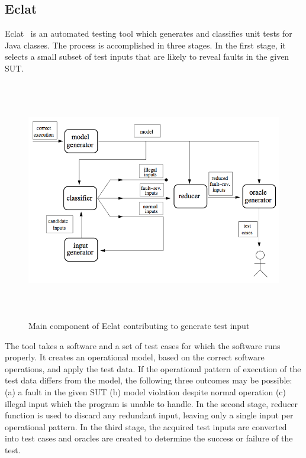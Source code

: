 \subsection{Eclat}
Eclat~\cite{Pacheco2005} is an automated testing tool which generates and classifies unit tests for Java classes. The process is accomplished in three stages. In the first stage, it selects a small subset of test inputs that are likely to reveal faults in the given SUT.

\begin{figure}[h]
	\centering
	\includegraphics[width=15cm, height=10.5cm]{chapter3/eclat_working.png}
	\caption{Main component of Eclat contributing to generate test input~\cite{Pacheco2005}}
	\label{fig:eclat}
\end{figure}


The tool takes a software and a set of test cases for which the software runs properly. It creates an operational model, based on the correct software operations, and apply the test data. If the operational pattern of execution of the test data differs from the model, the following three outcomes may be possible: (a) a fault in the given SUT (b) model violation despite normal operation (c) illegal input which the program is unable to handle. In the second stage, reducer function is used to discard any redundant input, leaving only a single input per operational pattern. In the third stage, the acquired test inputs are converted into test cases and oracles are created to determine the success or failure of the test. \\

